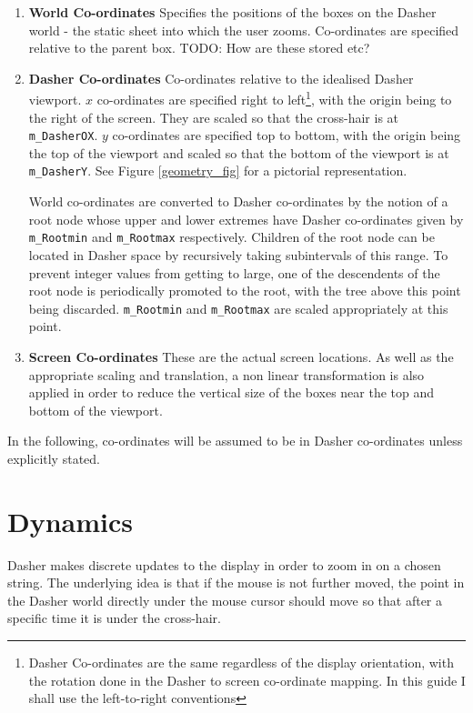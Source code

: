 \documentclass{article}
\begin{document}
\begin{enumerate}
\item {\bf World Co-ordinates} Specifies the positions of the boxes on the Dasher world - the static sheet into which the user zooms. Co-ordinates are specified relative to the parent box. TODO: How are these stored etc?
\item {\bf Dasher Co-ordinates} Co-ordinates relative to the idealised Dasher viewport. $x$ co-ordinates are specified right to left\footnote{Dasher Co-ordinates are the same regardless of the display orientation, with the rotation done in the Dasher to screen co-ordinate mapping. In this guide I shall use the left-to-right conventions}, with the origin being to the right of the screen. They are scaled so that the cross-hair is at {\tt m\_DasherOX}. $y$ co-ordinates are specified top to bottom, with the origin being the top of the viewport and scaled so that the bottom of the viewport is at {\tt m\_DasherY}. See Figure \ref{geometry_fig} for a pictorial representation.

World co-ordinates are converted to Dasher co-ordinates by the notion of a root node whose upper and lower extremes have Dasher co-ordinates given by {\tt m\_Rootmin} and {\tt m\_Rootmax} respectively. Children of the root node can be located in Dasher space by recursively taking subintervals of this range. To prevent integer values from getting to large, one of the descendents of the root node is periodically promoted to the root, with the tree above this point being discarded. {\tt m\_Rootmin} and {\tt m\_Rootmax} are scaled appropriately at this point.

\item {\bf Screen Co-ordinates} These are the actual screen locations. As well as the appropriate scaling and translation, a non linear transformation is also applied in order to reduce the vertical size of the boxes near the top and bottom of the viewport.

\end{enumerate}

In the following, co-ordinates will be assumed to be in Dasher co-ordinates unless explicitly stated.

\section{Dynamics}

Dasher makes discrete updates to the display in order to zoom in on a chosen string. The underlying idea is that if the mouse is not further moved, the point in the Dasher world directly under the mouse cursor should move so that after a specific time it is under the cross-hair. 
\end{document}
